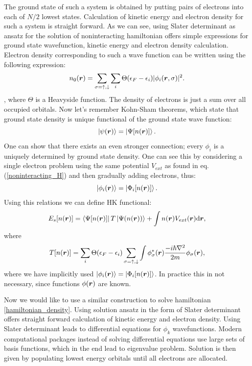 \documentclass[openany, longbibliography,slovene,a4paper,12pt]{article}
\def\vec#1{\mbox{\boldmath$#1$}}
\newcommand{\dif}{\mathrm{d}}
\begin{document}
 The ground state of such a system is obtained by putting pairs of electrons
 into each of  $N/2$ lowest states. Calculation of kinetic energy and
 electron density for such a system is straight forward. As we can see,
 using Slater  determinant as ansatz for the solution of noninteracting
 hamiltonian offers simple expressions for ground state wavefunction, kinetic
 energy and electron density  calculation. Electron density corresponding to
 such a wave function can be written using the following expression:
 \begin{equation} \label{KS_density}
   n_0(\vec r) = \sum_{\sigma=\uparrow,\downarrow}\sum_i\Theta(\epsilon_F-\epsilon_i)|\phi_i(\vec r, \sigma)|^2.
 \end{equation},
 where $\Theta$ is a Heavyside function.
 The density of electrons is just a sum over all occupied orbitals. Now let's
 remember Kohn-Sham theorems, which state that ground state density is unique
 functional of the ground state wave function:
 \begin{equation}
   \ket{\psi(\vec r)}= \ket{\Psi[n(\vec r)]}.
 \end{equation}
 One can show that there exists an even stronger connection; every $\phi_i$ is a
 uniquely determined by ground state density. One can see this by considering a single electron problem using the same potential $V_{ext}$ as found in eq.
 (\ref{noninteracting_H}) and then gradually adding electrons, thus:
 \begin{equation}
   \ket{\phi_i(\vec r)}= \ket{\Phi_i[n(\vec r)]}.
 \end{equation}
 Using this relations we can define HK functional:
 \begin{equation}
   E_s[n(\vec r)] = \bra{\Psi[n(\vec r)]}T \ket{\Psi(n(\vec r))} + \int n(\vec r) V_{ext}(\vec r)  \dif \vec r,
   \end{equation}
 where
\begin{equation} \label{KS_kinetic_term}
   T[n(\vec r)] = \sum_i\Theta(\epsilon_F-\epsilon_i)  \sum_{\sigma=\uparrow,\downarrow}\int \phi^*_\sigma(\vec r)\frac{-i\hbar\nabla^2}{2m}\phi_\sigma(\vec r),
 \end{equation}
 where we have implicitly used $\ket{\phi_i(\vec r)} = \ket{ \Phi_i[n(\vec r)] }$.
 In practice this in not necessary, since functions $\phi(\vec r)$ are known.
 
Now we would like to use a similar construction to solve hamiltonian
\ref{hamiltonian_density}. Using solution ansatz in the form of Slater
determinant offers straight forward calculation of kinetic energy and electron
density. Using Slater determinant leads to differential equations for $\phi_k$
wavefunctions. Modern computational packages instead of solving differential
equations use large sets of basis functions, which in the end lead to
eigenvalue problem. Solution is then given by populating
lowest energy orbitals until all electrons are allocated.
\end{document}

